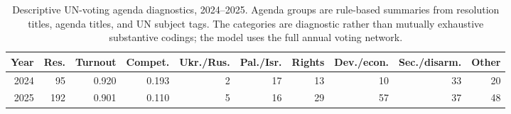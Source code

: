 \begin{table}[!htbp]
\centering
\begingroup
\scriptsize
\caption{Descriptive UN-voting agenda diagnostics, 2024--2025. Agenda groups are rule-based summaries from resolution titles, agenda titles, and UN subject tags. The categories are diagnostic rather than mutually exhaustive substantive codings; the model uses the full annual voting network.}
\label{tab:un-agenda-diagnostics}
\begin{tabularx}{\textwidth}{@{}rrrrrrrrrr@{}}
\toprule
Year & Res. & Turnout & Compet. & Ukr./Rus. & Pal./Isr. & Rights & Dev./econ. & Sec./disarm. & Other \\
\midrule
2024 & 95 & 0.920 & 0.193 & 2 & 17 & 13 & 10 & 33 & 20 \\
2025 & 192 & 0.901 & 0.110 & 5 & 16 & 29 & 57 & 37 & 48 \\
\bottomrule
\end{tabularx}
\endgroup
\end{table}
